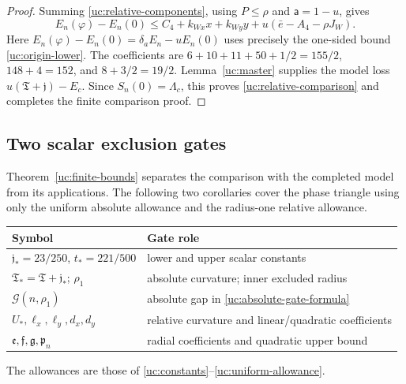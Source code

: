 \begin{proof}
Summing \eqref{uc:relative-components}, using $P\leq\rho$ and
$\mathsf a=1-u$, gives
\[
 E_n(\varphi)-E_n(0)\leq C_4+k_{Wx}x+k_{Wy}y
                       +u(\bar e-A_4-\rho J_W).
\]
Here $E_n(\varphi)-E_n(0)=\delta_aE_n-uE_n(0)$ uses precisely the
one-sided bound \eqref{uc:origin-lower}. The coefficients are
$6+10+11+50+1/2=155/2$, $148+4=152$, and $8+3/2=19/2$.
Lemma~\ref{uc:master} supplies the model loss
$u(\mathfrak T+\mathfrak j)-E_c$. Since $S_n(0)=\Lambda_c$,
this proves \eqref{uc:relative-comparison} and completes the finite comparison proof.
\end{proof}

\subsection{Two scalar exclusion gates}

Theorem~\ref{uc:finite-bounds} separates the comparison with the
completed model from its applications. The following two corollaries
cover the phase triangle using only the uniform absolute allowance and
the radius-one relative allowance.

\begin{center}\small
\begin{tabular}{@{}ll@{}}\toprule
Symbol & Gate role\\\midrule
$\mathfrak j_*=23/250$, $t_*=221/500$ & lower and upper scalar constants\\
$\mathfrak T_*=\mathfrak T+\mathfrak j_*$; $\rho_1$ & absolute curvature; inner excluded radius\\
$\mathcal G(n,\rho_1)$ & absolute gap in \eqref{uc:absolute-gate-formula}\\
$U_*,\ell_x,\ell_y,d_x,d_y$ & relative curvature and linear/quadratic coefficients\\
$\mathfrak e,\mathfrak f,\mathfrak g,\mathfrak p_n$ & radial coefficients and quadratic upper bound\\\bottomrule
\end{tabular}
\end{center}
The allowances are those of \eqref{uc:constants}--\eqref{uc:uniform-allowance}.


